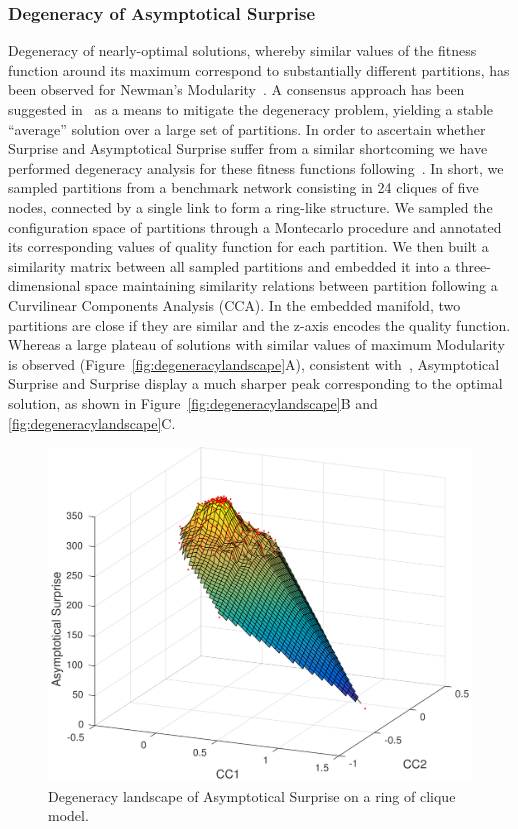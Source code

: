 \subsubsection{Degeneracy of Asymptotical Surprise}\label{sec:degeneracy_asymptotical_surprise}
Degeneracy of nearly-optimal solutions, whereby similar values of the fitness function around its maximum correspond to substantially different partitions, has been observed for Newman's Modularity~\cite{good2009}. A consensus approach has been suggested in~\cite{lancichinetti2012} as a means to mitigate the degeneracy problem, yielding a stable ``average'' solution over a large set of partitions. In order to ascertain whether Surprise and Asymptotical Surprise suffer from a similar shortcoming we have performed degeneracy analysis for these fitness functions following~\cite{good2009}.
In short, we sampled partitions from a benchmark network consisting in 24 cliques of five nodes, connected by a single link to form a ring-like structure.
We sampled the configuration space of partitions through a Montecarlo procedure and annotated its corresponding values of quality function for each partition.
We then built a similarity matrix between all sampled partitions and embedded it into a three-dimensional space maintaining similarity relations between partition following a Curvilinear Components Analysis (CCA).
In the embedded manifold, two partitions are close if they are similar and the z-axis encodes the quality function. Whereas a large plateau of solutions with similar values of maximum Modularity is observed (Figure~\ref{fig:degeneracylandscape}A), consistent with~\cite{good2009}, Asymptotical Surprise and Surprise display a much sharper peak corresponding to the optimal solution, as shown in Figure~\ref{fig:degeneracylandscape}B and \ref{fig:degeneracylandscape}C.
\begin{figure}[htb!]
\centering
\includegraphics[width=1.0\textwidth]{images/filtered_asymp_surp_ring_cliques_5_24_200.png}
\caption{Degeneracy landscape of Asymptotical Surprise on a ring of clique model.}
\label{fig:degeneracy_asymptotical_surprise}
\end{figure}

